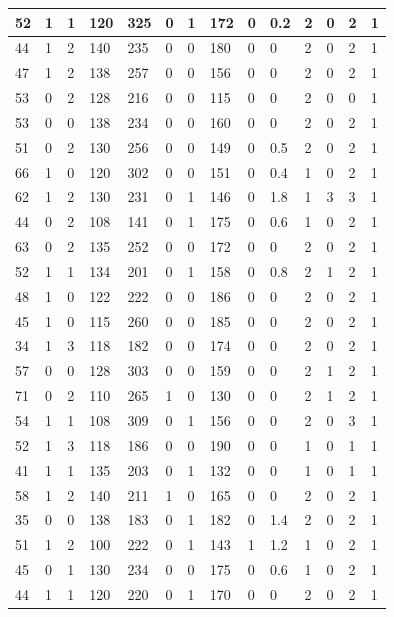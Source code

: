 \documentclass{article}
\begin{document}
\begin{table}[h!]
\begin{tabular}{|l|l|l|l|l|l|l|l|l|l|l|l|l|l|}
52 & 1 & 1 & 120 & 325 & 0 & 1 & 172 & 0 & 0.2 & 2  &0 & 2 & 1 \\ \hline
44 & 1 & 2 & 140 & 235 & 0 & 0 & 180 & 0 & 0 & 2  &0 & 2 & 1 \\ \hline
47 & 1 & 2 & 138 & 257 & 0 & 0 & 156 & 0 & 0 & 2  &0 & 2 & 1 \\ \hline
53 & 0 & 2 & 128 & 216 & 0 & 0 & 115 & 0 & 0 & 2  &0 & 0 & 1 \\ \hline
53 & 0 & 0 & 138 & 234 & 0 & 0 & 160 & 0 & 0 & 2  &0 & 2 & 1 \\ \hline
51 & 0 & 2 & 130 & 256 & 0 & 0 & 149 & 0 & 0.5 & 2  &0 & 2 & 1 \\ \hline
66 & 1 & 0 & 120 & 302 & 0 & 0 & 151 & 0 & 0.4 & 1  &0 & 2 & 1 \\ \hline
62 & 1 & 2 & 130 & 231 & 0 & 1 & 146 & 0 & 1.8 & 1  &3 & 3 & 1 \\ \hline
44 & 0 & 2 & 108 & 141 & 0 & 1 & 175 & 0 & 0.6 & 1  &0 & 2 & 1 \\ \hline
63 & 0 & 2 & 135 & 252 & 0 & 0 & 172 & 0 & 0 & 2  &0 & 2 & 1 \\ \hline
52 & 1 & 1 & 134 & 201 & 0 & 1 & 158 & 0 & 0.8 & 2  &1 & 2 & 1 \\ \hline
48 & 1 & 0 & 122 & 222 & 0 & 0 & 186 & 0 & 0 & 2  &0 & 2 & 1 \\ \hline
45 & 1 & 0 & 115 & 260 & 0 & 0 & 185 & 0 & 0 & 2  &0 & 2 & 1 \\ \hline
34 & 1 & 3 & 118 & 182 & 0 & 0 & 174 & 0 & 0 & 2  &0 & 2 & 1 \\ \hline
57 & 0 & 0 & 128 & 303 & 0 & 0 & 159 & 0 & 0 & 2  &1 & 2 & 1 \\ \hline
71 & 0 & 2 & 110 & 265 & 1 & 0 & 130 & 0 & 0 & 2  &1 & 2 & 1 \\ \hline
54 & 1 & 1 & 108 & 309 & 0 & 1 & 156 & 0 & 0 & 2  &0 & 3 & 1 \\ \hline
52 & 1 & 3 & 118 & 186 & 0 & 0 & 190 & 0 & 0 & 1  &0 & 1 & 1 \\ \hline
41 & 1 & 1 & 135 & 203 & 0 & 1 & 132 & 0 & 0 & 1  &0 & 1 & 1 \\ \hline
58 & 1 & 2 & 140 & 211 & 1 & 0 & 165 & 0 & 0 & 2  &0 & 2 & 1 \\ \hline
35 & 0 & 0 & 138 & 183 & 0 & 1 & 182 & 0 & 1.4 & 2  &0 & 2 & 1 \\ \hline
51 & 1 & 2 & 100 & 222 & 0 & 1 & 143 & 1 & 1.2 & 1  &0 & 2 & 1 \\ \hline
45 & 0 & 1 & 130 & 234 & 0 & 0 & 175 & 0 & 0.6 & 1  &0 & 2 & 1 \\ \hline
44 & 1 & 1 & 120 & 220 & 0 & 1 & 170 & 0 & 0 & 2  &0 & 2 & 1 \\ \hline

\end{tabular}
\end{table}
\end{document}
